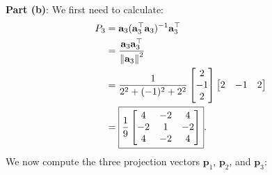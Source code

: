 \documentclass[11pt]{article}
\renewcommand{\vec}[1]{\mathbf{#1}}
\begin{document}
\textbf{Part (b)}: We first need to calculate:
\begin{align*}
	P_{3} &= \vec{a}_{3} (\vec{a}_{3}^{\top}\vec{a}_{3})^{-1}\vec{a}_{3}^{\top} \\
	&= \frac{\vec{a}_{3}\vec{a}_{3}^{\top}}{\norm{\vec{a}_{3}}^{2}} \\
	&= \frac{1}{2^{2} + (-1)^{2} + 2^{2}} \begin{bmatrix} 2 \\ -1 \\ 2 \end{bmatrix} \begin{bmatrix} 2 & -1 & 2 \end{bmatrix} \\
	&= \boxed{\frac{1}{9} \begin{bmatrix} 4 & -2 & 4 \\ -2 & 1 & -2 \\ 4 & -2 & 4 \end{bmatrix}}.
\end{align*}
We now compute the three projection vectors $\vec{p}_{1}$, $\vec{p}_{2}$, and $\vec{p}_{3}$:
\end{document}
